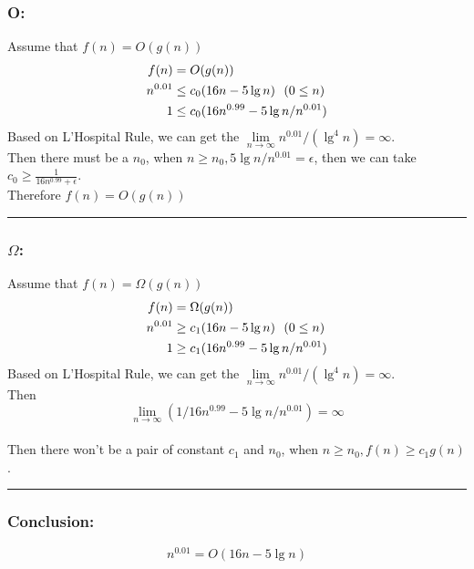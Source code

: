 \documentclass[oneside]{homework} %
\begin{document}
\subsubsection* {O:}
Assume that $f(n) = O(g(n))$\\
\begin{equation}
\notag
\begin{aligned}[b]
f(n) &= O(g(n)) \\
n^{0.01} & \leq c_{0}(16n-5 \lg n)  ~ ~(0\leq n)\\
1 & \leq c_{0}(16n^{0.99}-5\lg n / n^{0.01}) \\
\end{aligned}
\end{equation}
Based on L'Hospital Rule, we can get the $\lim\limits_{n\to\infty}{n^{0.01} / (\lg ^4 n)}  = \infty $.
\\Then there must be a $n_{0}$, when $n \geq n_{0} , 5\lg n /n^{0.01} = \epsilon $, then we can take $c_{0} \geq \frac{1}{16n^{0.99}+\epsilon}$.
\\ Therefore $f(n) = O(g(n))$ 
\\ \rule{3mm}{3mm}

\subsubsection* {$\Omega$:}
Assume that $f(n) = \Omega (g(n))$\\
\begin{equation}
\notag
\begin{aligned}[b]
f(n) &= \Omega(g(n)) \\
n^{0.01} & \geq c_{1}(16n-5 \lg n)  ~ ~(0\leq n)\\
1 & \geq c_{1}(16n^{0.99}-5\lg n / n^{0.01}) \\
\end{aligned}
\end{equation}
Based on L'Hospital Rule, we can get the $\lim\limits_{n\to\infty}{n^{0.01} / (\lg ^4 n)}  = \infty$.\\
Then $$\lim\limits_{n\to\infty}{(1 / 16n^{0.99}-5\lg n / n^{0.01})}  = \infty$$
\\Then there won't be a pair of constant $c_{1}$ and $n_{0}$, when $n \geq n_{0} , f(n) \geq c_{1}g(n) $.
\\ \rule{3mm}{3mm}

\subsubsection* {Conclusion:}
$$n^{0.01} = O(16n-5 \lg n)$$
\end{document}
